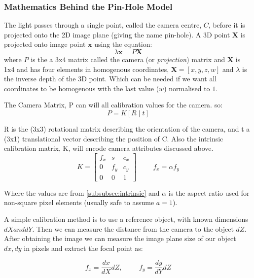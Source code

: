 \subsubsection{Mathematics Behind the Pin-Hole Model}
The light passes through a single point, called the camera centre, $C$, before it is projected onto the 2D image plane (giving the name pin-hole). 
A 3D point $\textbf{X}$ is projected onto image point $\textbf{x}$ using the equation:
\[\lambda \textbf{x} = P\textbf{X}\]
where $P$ is the a 3x4 matrix called the camera (or \emph{projection}) matrix and $\textbf{X}$ is 1x4 and has four elements in homogenous coordinates, \(\textbf{X} = [x, y, z, w]\) and $\lambda$ is the inverse depth of the 3D point. Which can be needed if we want all coordinates to be homogenous with the last value ($w$) normalised to $1$.

The Camera Matrix, P can will all calibration values for the camera. so:
\[P = K \left[R \mid t\right] \]

R is the (3x3) rotational matrix describing the orientation of the camera, and t a (3x1) translational vector describing the position of C.
Also the intrinsic calibration matrix, K, will encode camera attributes discussed above.
\[
  K = 
  \begin{bmatrix}
    f_x & s & c_x \\
    0 & f_y & c_y \\
    0 & 0 & 1
  \end{bmatrix}
  \hspace{1cm}
  f_x = \alpha f_y
\]

Where the values are from \ref{subsubsec:intrinsic} and $\alpha$ is the aspect ratio used for non-square pixel elements (usually safe to assume $a=1$).

A simple calibration method is to use a reference object, with known dimensions $dX and dY$. Then we can measure the distance from the camera to the object $dZ$. After obtaining the image we can measure the image plane size of our object $dx, dy$ in pixels and extract the focal point as:

\[ 
  f_x = \frac{dx}{dX} dZ , \hspace{1cm} f_y = \frac{dy}{dY}dZ
\]

